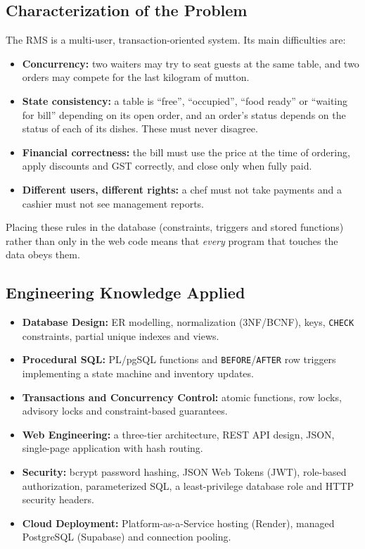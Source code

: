 \documentclass[11pt,a4paper]{report}
\begin{document}
\subsection{Characterization of the Problem}
The RMS is a multi-user, transaction-oriented system. Its main difficulties are:
\begin{itemize}
    \item \textbf{Concurrency:} two waiters may try to seat guests at the same table, and two orders may compete for the last kilogram of mutton.
    \item \textbf{State consistency:} a table is ``free'', ``occupied'', ``food ready'' or ``waiting for bill'' depending on its open order, and an order's status depends on the status of each of its dishes. These must never disagree.
    \item \textbf{Financial correctness:} the bill must use the price at the time of ordering, apply discounts and GST correctly, and close only when fully paid.
    \item \textbf{Different users, different rights:} a chef must not take payments and a cashier must not see management reports.
\end{itemize}
Placing these rules in the database (constraints, triggers and stored functions) rather than only in the web code means that \emph{every} program that touches the data obeys them.

\subsection{Engineering Knowledge Applied}
\begin{itemize}
    \item \textbf{Database Design:} ER modelling, normalization (3NF/BCNF), keys, \texttt{CHECK} constraints, partial unique indexes and views.
    \item \textbf{Procedural SQL:} PL/pgSQL functions and \texttt{BEFORE}/\texttt{AFTER} row triggers implementing a state machine and inventory updates.
    \item \textbf{Transactions and Concurrency Control:} atomic functions, row locks, advisory locks and constraint-based guarantees.
    \item \textbf{Web Engineering:} a three-tier architecture, REST API design, JSON, single-page application with hash routing.
    \item \textbf{Security:} bcrypt password hashing, JSON Web Tokens (JWT), role-based authorization, parameterized SQL, a least-privilege database role and HTTP security headers.
    \item \textbf{Cloud Deployment:} Platform-as-a-Service hosting (Render), managed PostgreSQL (Supabase) and connection pooling.
\end{itemize}
\end{document}
